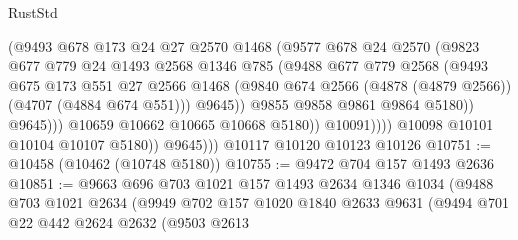 \begin{lexlean}{RustStd}
\begin{coremodule}
                              (@9493
                                @678
                                @173
                                @24
                                @27
                                @2570
                                @1468
                                (@9577
                                  @678
                                  @24
                                  @2570
                                  (@9823
                                    @677
                                    @779
                                    @24
                                    @1493
                                    @2568
                                    @1346
                                    @785
                                    (@9488
                                      @677
                                      @779
                                      @2568
                                      (@9493
                                        @675
                                        @173
                                        @551
                                        @27
                                        @2566
                                        @1468
                                        (@9840
                                          @674
                                          @2566
                                          (@4878 (@4879 @2566))
                                          (@4707 (@4884 @674 @551)))
                                        @9645))
                                    @9855
                                    @9858
                                    @9861
                                    @9864
                                    @5180))
                                @9645)))
                          @10659
                          @10662
                          @10665
                          @10668
                          @5180))
                      @10091))))
              @10098
              @10101
              @10104
              @10107
              @5180))
          @9645)))
    @10117
    @10120
    @10123
    @10126
@10751 := @10458 (@10462 (@10748 @5180))
@10755 := @9472 @704 @157 @1493 @2636
@10851 := @9663
    @696
    @703
    @1021
    @157
    @1493
    @2634
    @1346
    @1034
    (@9488
      @703
      @1021
      @2634
      (@9949
        @702
        @157
        @1020
        @1840
        @2633
        @9631
        (@9494
          @701
          @22
          @442
          @2624
          @2632
          (@9503
            @2613

\end{coremodule}
\end{lexlean}
